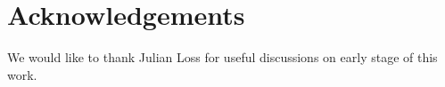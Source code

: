 \section*{Acknowledgements}
We would like to thank Julian Loss for useful discussions on early stage of this work. 
